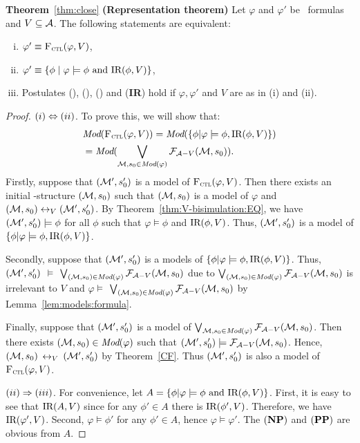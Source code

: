 \documentclass{article}
\begin{document}
\noindent \textbf{Theorem}~\ref{thm:close}
 \textbf{(Representation theorem)}
Let $\varphi$ and $\varphi'$ be \CTL\ formulas and $V \subseteq {\cal A}$.
The following statements are equivalent:
\begin{enumerate}[(i)]
  \item $\varphi' \equiv {\textsc{F}_{\textsc{ctl}}}(\varphi, V)$,
  \item $\varphi'\equiv \{\phi \mid\varphi \models \phi \text{ and } \textrm{IR}(\phi, V)\}$,
  \item Postulates (\W), (\PP), (\NgP) and (\textbf{IR}) hold if $\varphi,   \varphi'$ and $V$ are as in (i) and (ii).
\end{enumerate}
 \begin{proof}
 $(i) \Leftrightarrow (ii)$. To prove this, we will show that:
 \begin{align*}
  & \textit{Mod}({\textsc{F}_{\textsc{ctl}}}(\varphi, V)) = \textit{Mod}(\{\phi | \varphi \models \phi, \textrm{IR}(\phi, V)\})\\
  & = \textit{Mod}(\bigvee_{{\cal M}, s_0\in \textit{Mod}(\varphi)} {\cal F}_{{\cal A}- V}({\cal M}, s_0)).
 \end{align*}
 Firstly, suppose that $({\cal M}', s_0')$ is a model of ${\textsc{F}_{\textsc{ctl}}}(\varphi, V)$. Then there exists an initial \MPK-structure $({\cal M}, s_0)$ such that $({\cal M}, s_0)$ is a model of $\varphi$ and $({\cal M}, s_0) \leftrightarrow_V ({\cal M}', s_0')$. By Theorem~\ref{thm:V-bisimulation:EQ}, we have $({\cal M}', s_0') \models \phi$ for all $\phi$ such that $\varphi\models \phi$ and $\textrm{IR}(\phi, V)$. Thus, $({\cal M}', s_0')$ is a model of $\{\phi | \varphi \models \phi, \textrm{IR}(\phi, V)\}$.

 Secondly, suppose that $({\cal M}', s_0')$ is a models of $\{\phi | \varphi \models \phi, \textrm{IR}(\phi, V)\}$. Thus, $({\cal M}', s_0')$ $\models$ $\bigvee_{({\cal M}, s_0)\in \textit{Mod}(\varphi)} {\cal F}_{{\cal A}- V}({\cal M}, s_0)$ due to $\bigvee_{({\cal M}, s_0)\in \textit{Mod}(\varphi)} {\cal F}_{{\cal A}- V}({\cal M}, s_0)$ is irrelevant to $V$ and $\varphi \models$ $\bigvee_{({\cal M}, s_0)\in \textit{Mod}(\varphi)} {\cal F}_{{\cal A}- V}({\cal M}, s_0)$ by Lemma~\ref{lem:models:formula}.

 Finally, suppose that $({\cal M}', s_0')$ is a model of $\bigvee_{{\cal M}, s_0\in \textit{Mod}(\varphi)} {\cal F}_{{\cal A}- V}({\cal M}, s_0)$. Then there exists $({\cal M}, s_0) \in \textit{Mod}(\varphi)$ such that $({\cal M}', s_0') \models {\cal F}_{{\cal A}- V}({\cal M}, s_0)$. Hence, $({\cal M}, s_0)$ $\leftrightarrow_V$ $({\cal M}', s_0')$ by Theorem~\ref{CF}. Thus $({\cal M}', s_0')$ is also a model of ${\textsc{F}_{\textsc{ctl}}}(\varphi,V)$.


 $(ii)\Rightarrow (iii)$. For convenience, let $A=\{\phi | \varphi \models \phi \text{ and } \textrm{IR}(\phi, V)\}$. First, it is easy to see that $\textrm{IR}(A, V)$ since for any $\phi' \in A$ there is $\textrm{IR}(\phi', V)$. Therefore, we have $\textrm{IR}(\varphi',V)$. Second, $\varphi \models \phi'$ for any $\phi'\in A$, hence $\varphi \models \varphi'$. The $(\textbf{NP})$ and $(\textbf{PP})$ are obvious from $A$.


\end{proof}
\end{document}
